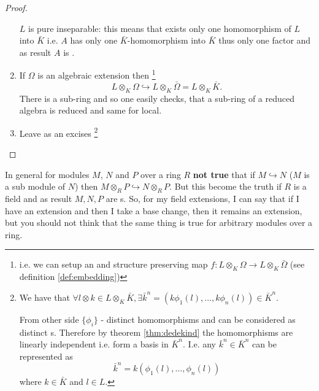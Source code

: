 \begin{theorem}
\begin{proof}
\begin{enumerate}
      $L$ is pure inseparable: this means that exists only one
      homomorphism of $L$ into $\bar{K}$ i.e. $A$ has only one
      $\bar{K}$-homomorphism into $\bar{K}$ thus only one factor and
      as result $A$ is .
    \item If $\Omega$ is an algebraic extension then
      \footnote {
        i.e. we can setup an  and structure
        preserving map $f: L \otimes_K \Omega \to L \otimes_K
        \bar{\Omega}$ (see definition \ref{def:embedding}) 
      }
      \[
      L \otimes_K \Omega \hookrightarrow L \otimes_K \bar{\Omega} =
      L \otimes_K \bar{K}.
      \]
      There is a sub-ring and so one easily checks, that a sub-ring of
      a reduced algebra is reduced and same for local.  
    \item Leave as an excises
      \footnote{
        We have that
        $\forall l \otimes k \in L \otimes_K \bar{K}, \exists
        \bar{k}^n = \left(
        k \phi_1\left(l\right),
        \dots,
        k \phi_n\left(l\right)
        \right) \in \bar{K}^n$.

        From other side $\{\phi_i\}$ - distinct homomorphisms and can
        be considered as distinct s. Therefore
        by theorem \ref{thm:dedekind} the homomorphisms are linearly
        independent i.e. form a basis in $\bar{K}^n$. I.e.
        any $\bar{k}^n \in \bar{K}^n$ can be represented as
        \[
        \bar{k}^n = k
        \left(
        \phi_1\left(l\right),
        \dots,
        \phi_n\left(l\right)
        \right)
        \]
        where $k \in \bar{K}$ and $l \in L$.
      }
    \end{enumerate}
  \end{proof}
  \label{thm:lec5_1}
\end{theorem}
\begin{remark}
In general for modules $M$, $N$ and $P$ over a ring $R$ \textbf{not true} that
if $M \hookrightarrow N$ ($M$ is a sub module of $N$) then
$M \otimes_R P \hookrightarrow N \otimes_R P$. But this become the
truth if $R$ is a field and as result $M,N,P$ are
s. So, for my field extensions, I can say
that if I have an extension and then I take a base change, then it
remains an extension, but  you should not think that the same thing is
true for arbitrary modules over a ring.  
\end{remark}

